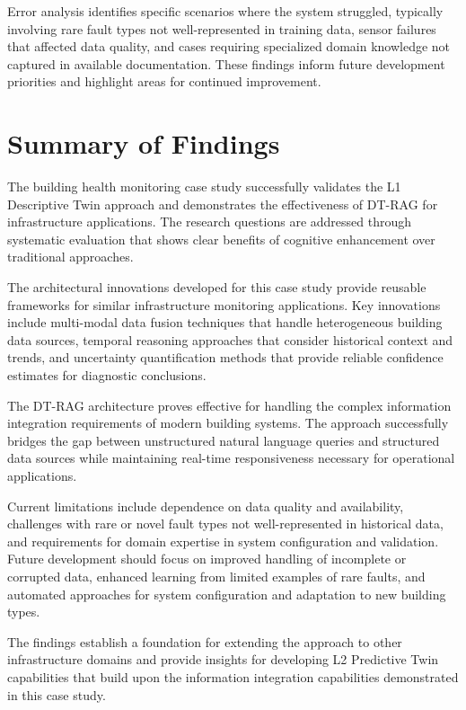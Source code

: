 Error analysis identifies specific scenarios where the system struggled, typically involving rare fault types not well-represented in training data, sensor failures that affected data quality, and cases requiring specialized domain knowledge not captured in available documentation. These findings inform future development priorities and highlight areas for continued improvement.

\section{Summary of Findings}

The building health monitoring case study successfully validates the L1 Descriptive Twin approach and demonstrates the effectiveness of DT-RAG for infrastructure applications. The research questions are addressed through systematic evaluation that shows clear benefits of cognitive enhancement over traditional approaches.

The architectural innovations developed for this case study provide reusable frameworks for similar infrastructure monitoring applications. Key innovations include multi-modal data fusion techniques that handle heterogeneous building data sources, temporal reasoning approaches that consider historical context and trends, and uncertainty quantification methods that provide reliable confidence estimates for diagnostic conclusions.

The DT-RAG architecture proves effective for handling the complex information integration requirements of modern building systems. The approach successfully bridges the gap between unstructured natural language queries and structured data sources while maintaining real-time responsiveness necessary for operational applications.

Current limitations include dependence on data quality and availability, challenges with rare or novel fault types not well-represented in historical data, and requirements for domain expertise in system configuration and validation. Future development should focus on improved handling of incomplete or corrupted data, enhanced learning from limited examples of rare faults, and automated approaches for system configuration and adaptation to new building types.

The findings establish a foundation for extending the approach to other infrastructure domains and provide insights for developing L2 Predictive Twin capabilities that build upon the information integration capabilities demonstrated in this case study.
